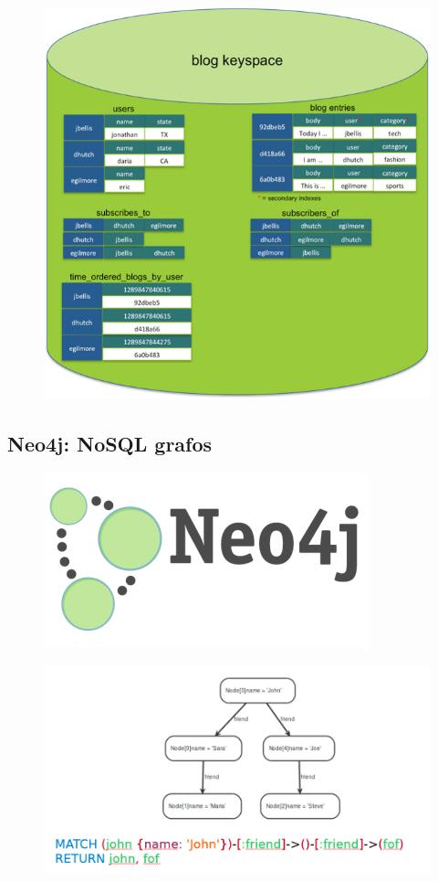 \documentclass[]{book}
\begin{document}
\begin{figure}
\centering
\includegraphics{images/BlogNoSQL.png}
\caption{}
\end{figure}

\subsection{Neo4j: NoSQL grafos}\label{neo4j-nosql-grafos}

\begin{figure}
\centering
\includegraphics{images/Neo4jlogo.png}
\caption{}
\end{figure}

\begin{figure}
\centering
\includegraphics{images/CypherQuery.png}
\caption{}
\end{figure}
\end{document}
